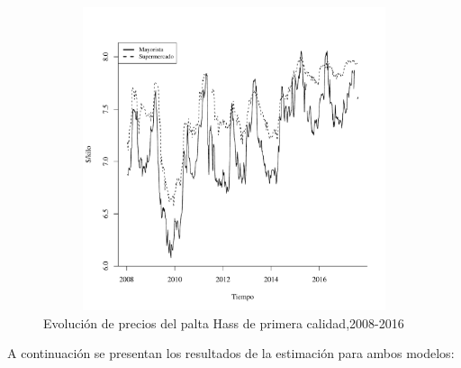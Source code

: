 \documentclass[12pt, twoside]{book}\usepackage[]{graphicx}\usepackage[]{color}
\newenvironment{knitrout}{}{} %
\numberwithin{equation}{section}
\numberwithin{theorem}{section}
\numberwithin{teorema}{section}
\numberwithin{defi}{section}
\numberwithin{prop}{section}
\numberwithin{defi}{section}
\theoremstyle{plain}
\begin{document}
\begin{knitrout}
\color{fgcolor}\begin{figure}[H]

{\centering \includegraphics[width=6.5in,height=3.5in]{figure/fig-2-1} 

}

\caption[Evolución de precios del palta Hass de primera calidad,2008-2016]{Evolución de precios del palta Hass de primera calidad,2008-2016}\label{fig:fig-2}
\end{figure}


\end{knitrout}

A continuación se presentan los resultados de la estimación para ambos modelos: 
\end{document}

